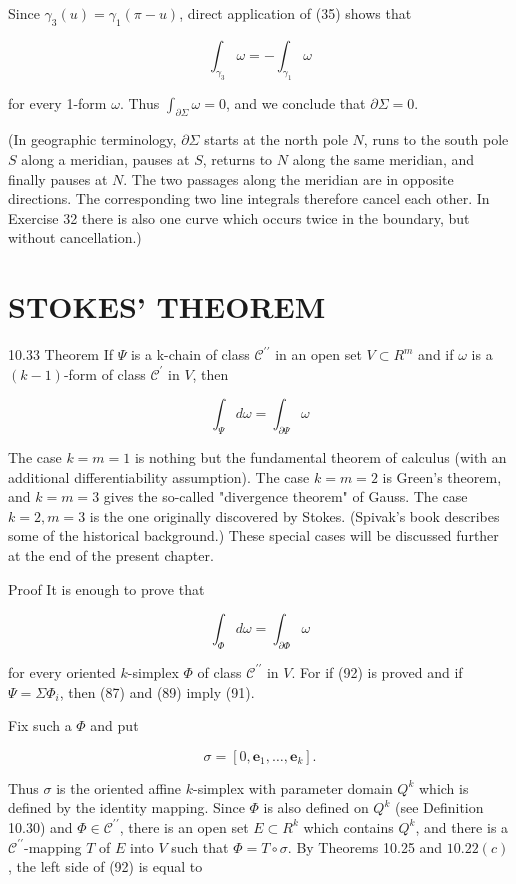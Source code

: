 \documentclass[10pt]{article}
\begin{document}
Since $\gamma_{3}(u)=\gamma_{1}(\pi-u)$, direct application of (35) shows that

$$
\int_{\gamma_{3}} \omega=-\int_{\gamma_{1}} \omega
$$

for every 1-form $\omega$. Thus $\int_{\partial \Sigma} \omega=0$, and we conclude that $\partial \Sigma=0$.

(In geographic terminology, $\partial \Sigma$ starts at the north pole $N$, runs to the south pole $S$ along a meridian, pauses at $S$, returns to $N$ along the same meridian, and finally pauses at $N$. The two passages along the meridian are in opposite directions. The corresponding two line integrals therefore cancel each other. In Exercise 32 there is also one curve which occurs twice in the boundary, but without cancellation.)

\section{STOKES' THEOREM}
10.33 Theorem If $\Psi$ is a k-chain of class $\mathscr{C}^{\prime \prime}$ in an open set $V \subset R^{m}$ and if $\omega$ is a $(k-1)$-form of class $\mathscr{C}^{\prime}$ in $V$, then

$$
\int_{\Psi} d \omega=\int_{\partial \Psi} \omega
$$

The case $k=m=1$ is nothing but the fundamental theorem of calculus (with an additional differentiability assumption). The case $k=m=2$ is Green's theorem, and $k=m=3$ gives the so-called "divergence theorem" of Gauss. The case $k=2, m=3$ is the one originally discovered by Stokes. (Spivak's book describes some of the historical background.) These special cases will be discussed further at the end of the present chapter.

Proof It is enough to prove that

$$
\int_{\Phi} d \omega=\int_{\partial \Phi} \omega
$$

for every oriented $k$-simplex $\Phi$ of class $\mathscr{C}^{\prime \prime}$ in $V$. For if (92) is proved and if $\Psi=\Sigma \Phi_{i}$, then (87) and (89) imply (91).

Fix such a $\Phi$ and put

$$
\sigma=\left[0, \mathbf{e}_{1}, \ldots, \mathbf{e}_{k}\right] .
$$

Thus $\sigma$ is the oriented affine $k$-simplex with parameter domain $Q^{k}$ which is defined by the identity mapping. Since $\Phi$ is also defined on $Q^{k}$ (see Definition 10.30) and $\Phi \in \mathscr{C}^{\prime \prime}$, there is an open set $E \subset R^{k}$ which contains $Q^{k}$, and there is a $\mathscr{C}^{\prime \prime}$-mapping $T$ of $E$ into $V$ such that $\Phi=T \circ \sigma$. By Theorems 10.25 and $10.22(c)$, the left side of (92) is equal to
\end{document}
